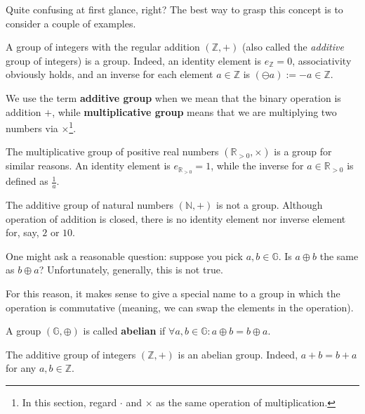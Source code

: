 \documentclass[../lecture-notes.tex]{subfiles}
\begin{document}
Quite confusing at first glance, right? The best way to grasp this concept is to consider a couple of examples.

\begin{example}
    A group of integers with the regular addition $(\mathbb{Z},+)$ (also called the \textit{additive} group of integers) is a group. Indeed, an identity element is $e_{\mathbb{Z}}=0$, associativity obviously holds, and an inverse for each element $a \in \mathbb{Z}$ is $(\ominus a) := -a \in \mathbb{Z}$. 
\end{example}

\begin{remark}
    We use the term \textbf{additive group} when we mean that the binary operation is addition $+$, while \textbf{multiplicative group} means that we are multiplying two numbers via $\times$\footnote{In this section, regard $\cdot$ and $\times$ as the same operation of multiplication.}.
\end{remark}

\begin{example}
    The multiplicative group of positive real numbers $(\mathbb{R}_{> 0}, \times)$ is a group for similar reasons. An identity element is $e_{\mathbb{R}_{>0}} = 1$, while the inverse for $a \in \mathbb{R}_{>0}$ is defined as $\frac{1}{a}$.
\end{example}

\begin{example}
    The additive group of natural numbers $(\mathbb{N}, +)$ is not a group. Although operation of addition is closed, there is no identity element nor inverse element for, say, $2$ or $10$.
\end{example}

One might ask a reasonable question: suppose you pick $a,b \in \mathbb{G}$. Is $a \oplus b$ the same as $b \oplus a$? Unfortunately, generally, this is not true. 

For this reason, it makes sense to give a special name to a group in which the operation is commutative (meaning, we can swap the elements in the operation).

\begin{definition}
    A group $(\mathbb{G},\oplus)$ is called \textbf{abelian} if $\forall a,b \in \mathbb{G}: a \oplus b = b \oplus a$.
\end{definition}

\begin{example}
    The additive group of integers $(\mathbb{Z},+)$ is an abelian group. Indeed, $a + b = b + a$ for any $a,b \in \mathbb{Z}$.
\end{example}
\end{document}
